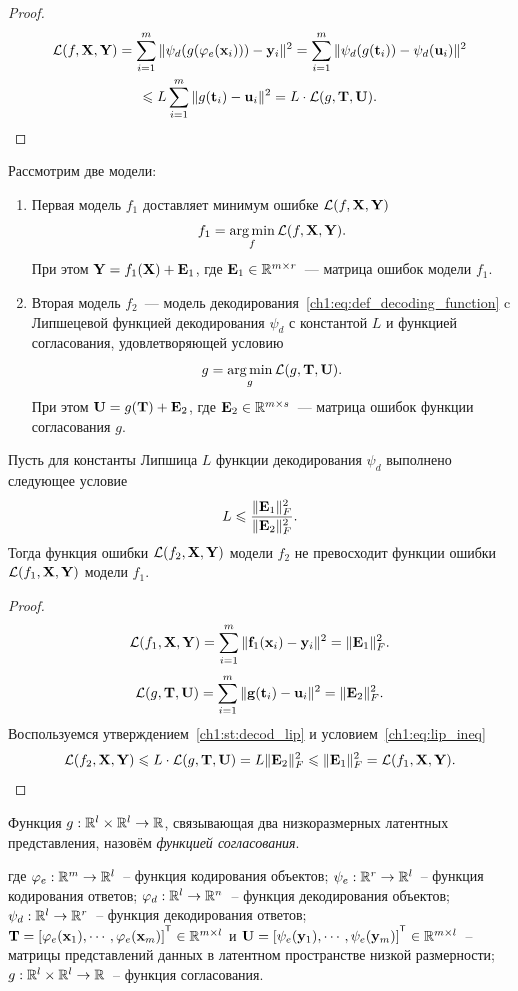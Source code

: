 \begin{proof}
	\begin{multline*}
		\mathcal{L}(f, \mathbf{X}, \mathbf{Y}) = \sum_{i=1}^m \| \psi_d (g (\varphi_e(\mathbf{x}_i))) - \mathbf{y}_i \|^2  = \sum_{i=1}^m \| \psi_d (g (\mathbf{t}_i)) - \psi_d (\mathbf{u}_i) \|^2 \\\leqslant L \sum_{i=1}^m \| g (\mathbf{t}_i) - \mathbf{u}_i \|^2 = L \cdot \mathcal{L}(g, \mathbf{T}, \mathbf{U}).
	\end{multline*}
\end{proof}
\begin{theorem}
	Рассмотрим две модели:
	\begin{enumerate}
		\item Первая модель $f_1$ доставляет минимум ошибке $\mathcal{L}(f, \mathbf{X}, \mathbf{Y})$
		\[
		f_1 = \mathop{\arg \min}\limits_f \mathcal{L}(f, \mathbf{X}, \mathbf{Y}).
		\]
		При этом $\mathbf{Y} = f_1(\mathbf{X}) + \mathbf{E}_1$, где $\mathbf{E}_1 \in \mathbb{R}^{m \times r}$~--- матрица ошибок модели $f_1$.
		
		\item Вторая модель $f_2$~--- модель декодирования~\eqref{ch1:eq:def_decoding_function} c Липшецевой функцией декодирования $\psi_d$ с константой $L$ и функцией согласования, удовлетворяющей условию
		\[
			g = \mathop{\arg \min}\limits_g \mathcal{L}(g, \mathbf{T}, \mathbf{U}).
		\]
		При этом $\mathbf{U} = g(\mathbf{T}) + \mathbf{E}_2$, где $\mathbf{E}_2 \in \mathbb{R}^{m \times s}$~--- матрица ошибок функции согласования $g$.
	\end{enumerate}
	Пусть для константы Липшица $L$ функции декодирования $\psi_d$ выполнено следующее условие
	\begin{equation}
		L \leqslant \frac{\|\mathbf{E}_1\|_F^2}{\|\mathbf{E}_2\|_F^2}.
		\label{ch1:eq:lip_ineq}
	\end{equation}
	Тогда функция ошибки $\mathcal{L}(f_2, \mathbf{X}, \mathbf{Y})$ модели $f_2$ не превосходит функции ошибки $\mathcal{L}(f_1, \mathbf{X}, \mathbf{Y})$ модели $f_1$.
\end{theorem}

\begin{proof}
	\[
		\mathcal{L} (f_1, \mathbf{X}, \mathbf{Y}) = \sum_{i=1}^m \| \mathbf{f}_1(\mathbf{x}_i) - \mathbf{y}_i\|^2 = \| \mathbf{E}_1 \|_F^2.
	\]
	\[
	\mathcal{L} (g, \mathbf{T}, \mathbf{U}) = \sum_{i=1}^m \| \mathbf{g}(\mathbf{t}_i) - \mathbf{u}_i\|^2 = \| \mathbf{E}_2 \|_F^2.
	\]
	Воспользуемся утверждением~\ref{ch1:st:decod_lip} и условием~\eqref{ch1:eq:lip_ineq}
	\[
		\mathcal{L} (f_2, \mathbf{X}, \mathbf{Y}) \leqslant L \cdot \mathcal{L}(g, \mathbf{T}, \mathbf{U}) = L \| \mathbf{E}_2 \|_F^2 \leqslant \| \mathbf{E}_1 \|_F^2 = \mathcal{L}(f_1, \mathbf{X}, \mathbf{Y}).
	\]
\end{proof}

\hrulefill

\begin{definition}
	Функция $g: \mathbb{R}^l \times \mathbb{R}^l \to \mathbb{R}$, связывающая два низкоразмерных латентных представления, назовём \textit{функцией согласования}.
\end{definition}
где $\varphi_e: \mathbb{R}^m \to \mathbb{R}^l$~--  функция кодирования объектов; $\psi_e: \mathbb{R}^r \to \mathbb{R}^l$~--  функция кодирования ответов; $\varphi_d: \mathbb{R}^l \to \mathbb{R}^n$~--  функция декодирования объектов; $\psi_d: \mathbb{R}^l \to \mathbb{R}^r$~--  функция декодирования ответов; $\bT = [\varphi_e(\bx_1), \cdots, \varphi_e(\bx_m)]^{\T}  \in \bbR^{m\times l}$ и $\bU =[\psi_e(\by_1), \cdots, \psi_e(\by_m)]^{\T} \in \bbR^{m\times l}$~-- матрицы представлений данных в латентном пространстве низкой размерности; $g: \mathbb{R}^l \times \mathbb{R}^l \to \mathbb{R}$~-- функция согласования.

